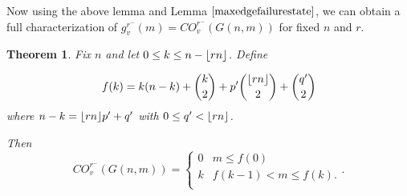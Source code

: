\documentclass[12pt]{article}
\DeclarePairedDelimiter{\floor}{\lfloor}{\rfloor}
\newtheorem{theorem}{Theorem}[section]
\theoremstyle{definition}
\newcommand{\COVMIN}[1]{CO^{r^-}_{v}(#1)}
\newcommand{\gvMIN}[1]{g_{v}^{r^-}(#1)}
\begin{document}


Now using the above lemma and Lemma $\ref{maxedgefailurestate}$, we can obtain a full characterization of $\gvMIN{m}=\COVMIN{G(n,m)}$ for fixed $n$ and $r$.

\begin{theorem} \label{covmin}
Fix $n$ and let $0\le k \leq n - \floor{rn}$. Define 

$$f(k) = k(n-k) + \binom{k}{2} + p'\binom{\floor{rn}}{2} + \binom{q'}{2}$$
where $n-k = \floor{rn}p'+q'$ with $0 \leq q' < \floor{rn}$.

Then 
$$
\COVMIN{G(n,m)} = \begin{cases} 
  0 & m \leq f(0)\\
  k & f(k-1) < m \leq f(k).\\
  \end{cases}.
$$
\end{theorem}
\end{document}
